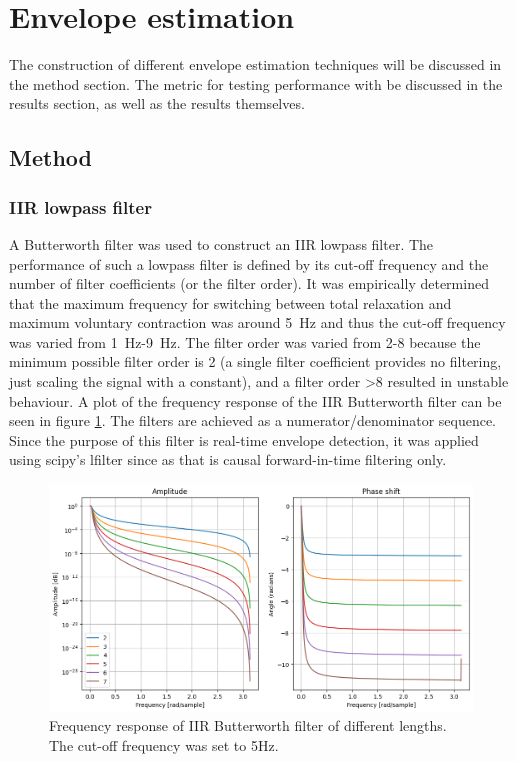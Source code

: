 \section{Envelope estimation}
The construction of different envelope estimation techniques will be discussed in the method section. The metric for testing performance with be discussed in the results section, as well as the results themselves.

\subsection{Method}
\subsubsection{IIR lowpass filter}
A Butterworth filter was used to construct an IIR lowpass filter. The performance of such a lowpass filter is defined by its cut-off frequency and the number of filter coefficients (or the filter order). It was empirically determined that the maximum frequency for switching between total relaxation and maximum voluntary contraction was around \SI{5}{\hertz} and thus the cut-off frequency was varied from \SI{1}{\hertz}-\SI{9}{\hertz}. The filter order was varied from 2-8 because the minimum possible filter order is 2 (a single filter coefficient provides no filtering, just scaling the signal with a constant), and a filter order >8 resulted in unstable behaviour. A plot of the frequency response of the IIR Butterworth filter can be seen in figure \ref{fig:iir_frequencyresponse_coefficients}. The filters are achieved as a numerator/denominator sequence. Since the purpose of this filter is real-time envelope detection, it was applied using scipy's lfilter since as that is causal forward-in-time filtering only.


\begin{figure}[h!t]
	\begin{center}
		\includegraphics[width=1.0\columnwidth]{images/iir_frequencyresponse_coefficients.png}
	\end{center}
	\caption{Frequency response of IIR Butterworth filter of different lengths. The cut-off frequency was set to 5Hz.}
	\label{fig:iir_frequencyresponse_coefficients}
\end{figure}

